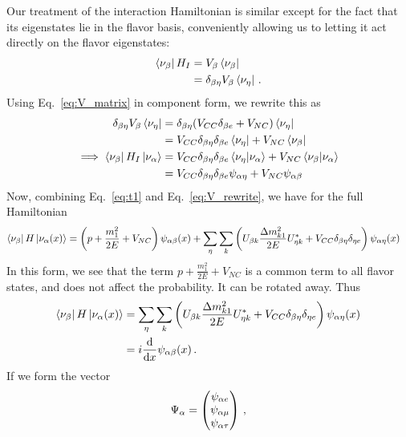 Our treatment of the interaction Hamiltonian is similar except for the fact that its eigenstates lie in the flavor basis, conveniently allowing us
to letting it act directly on the flavor eigenstates:
\begin{align}
    \bra{\nu_\beta}H_I &= V_\beta \bra{\nu_\beta} \nonumber \\
                    &= \delta_{\beta\eta} V_\beta \bra{\nu_\eta}\,.
\end{align}
Using Eq.~\ref{eq:V_matrix} in component form, we rewrite this as
\begin{align}\label{eq:V_rewrite}
    \delta_{\beta\eta} V_\beta \bra{\nu_\eta} &= \delta_{\beta\eta} (V_{CC}\delta_{\beta e} + V_{NC}) \bra{\nu_\eta} \nonumber \\
                                           &= V_{CC}\delta_{\beta\eta}\delta_{\beta e} \bra{\nu_\eta} + V_{NC}\bra{\nu_\beta} \nonumber \\
    \implies \bra{\nu_\beta}H_I\ket{\nu_\alpha}   &= V_{CC}\delta_{\beta\eta}\delta_{\beta e} \bra{\nu_\eta}\ket{\nu_\alpha} + V_{NC}\bra{\nu_\beta}\ket{\nu_\alpha} \nonumber \\
                                           &= V_{CC}\delta_{\beta\eta}\delta_{\beta e} \psi_{\alpha\eta} + V_{NC}\psi_{\alpha\beta}
\end{align}
Now, combining Eq.~\ref{eq:t1} and Eq.~\ref{eq:V_rewrite}, we have for the full Hamiltonian
\begin{align}
    \bra{\nu_\b}H\ket{\nu_\a (x)} &= \left(p + \frac{m^2_1}{2E} + V_{NC}\right) \psi_{\a\b}(x) + \sum_\eta\sum_k \left(U_{\b k} \frac{\dm_{k1}}{2E} U^*_{\eta k} + V_{CC}\delta_{\b\eta}\delta_{\eta e} \right) \psi_{\a\eta}(x)
\end{align}
In this form, we see that the term $p + \frac{m^2_1}{2E} + V_{NC}$  is a common term to all flavor states, and does not affect the probability. It can be rotated away.
Thus
\begin{align}\label{eq:components}
    \bra{\nu_\b}H\ket{\nu_\a (x)} &= \sum_\eta\sum_k \left(U_{\b k} \frac{\dm_{k1}}{2E} U^*_{\eta k} + V_{CC}\delta_{\b\eta}\delta_{\eta e}\right) \psi_{\a\eta}(x) \nonumber \\
                                  &= i \dv{}{x}\psi_{\a\b}(x)\,.
\end{align}
If we form the vector 
\begin{align}
    \Psi_\alpha = \begin{pmatrix}
        \psi_{\alpha e} \\
        \psi_{\alpha \mu} \\
        \psi_{\alpha \tau}
    \end{pmatrix}\,,
\end{align}
